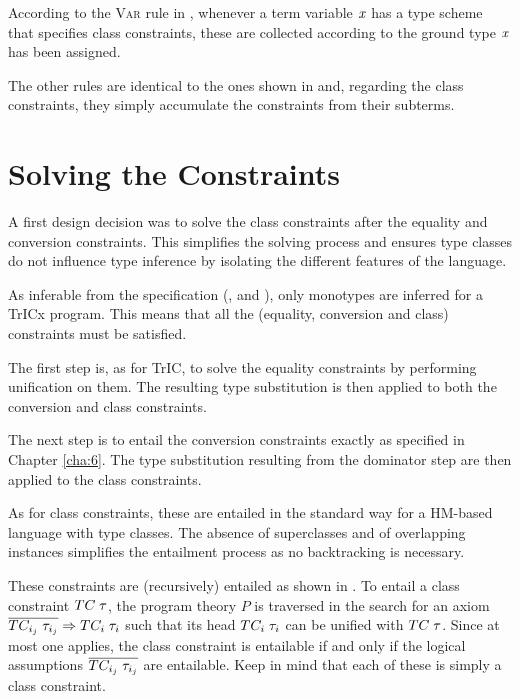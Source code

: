 According to the \textsc{Var} rule in , whenever a term variable $\mathit{x}$ has a type scheme that specifies class constraints, these are collected according to the ground type $\mathit{x}$ has been assigned.

The other rules are identical to the ones shown in  and, regarding the class constraints, they simply accumulate the constraints from their subterms.
\section{Solving the Constraints}
\label{clssolving}

A first design decision was to solve the class constraints after the equality and conversion constraints. This simplifies the solving process and ensures type classes do not influence type inference by isolating the different features of the language.

As inferable from the specification (,  and ), only monotypes are inferred for a TrICx program. This means that all the (equality, conversion and class) constraints must be satisfied.

The first step is, as for TrIC, to solve the equality constraints by performing unification on them. The resulting type substitution is then applied to both the conversion and class constraints.

The next step is to entail the conversion constraints exactly as specified in Chapter \ref{cha:6}. The type substitution resulting from the dominator step are then applied to the class constraints.

As for class constraints, these are entailed in the standard way for a HM-based language with type classes. The absence of superclasses and of overlapping instances simplifies the entailment process as no backtracking is necessary.

These constraints are (recursively) entailed as shown in . To entail a class constraint $TC\;\mathit{\tau}$, the program theory $P$ is traversed in the search for an axiom $\overline{TC_{i_j}\;\mathit{\tau}_{i_j}}\Rightarrow TC_i\;\mathit{\tau}_i$ such that its head $TC_i\;\mathit{\tau}_i$ can be unified with $TC\;\mathit{\tau}$. Since at most one applies, the class constraint is entailable if and only if the logical assumptions $\overline{TC_{i_j}\;\mathit{\tau}_{i_j}}$ are entailable. Keep in mind that each of these is simply a class constraint.

